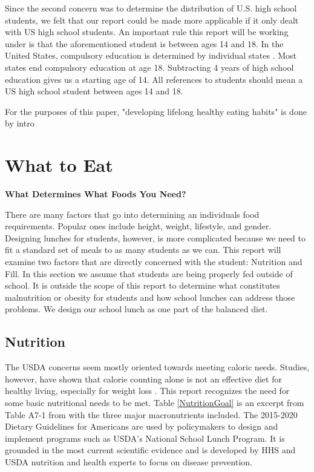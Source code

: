 \documentclass[letterpaper,oneside,12pt]{report}
\begin{document}
Since the second concern was to determine the distribution of U.S. high school students, we felt that our report could be made more applicable if it only dealt with US high school students. An important rule this report will be working under is that the aforementioned student is between ages 14 and 18. In the United States, compulsory education is determined by individual states \cite{aragon_2015}. Most states end compulsory education at age 18. Subtracting 4 years of high school education gives us a starting age of 14. All references to students should mean a US high school student between ages 14 and 18.

For the purposes of this paper, "developing lifelong healthy eating habits" is done by intro

\chapter{What to Eat}\label{What to Eat}

\textbf{What Determines What Foods You Need?}

There are many factors that go into determining an individuals food requirements. Popular ones include height, weight, lifestyle, and gender. Designing lunches for students, however, is more complicated because we need to fit a standard set of meals to as many students as we can. This report will examine two factors that are directly concerned with the student: Nutrition and Fill. In this section we assume that students are being properly fed outside of school. It is outside the scope of this report to determine what constitutes malnutrition or obesity for students and how school lunches can address those problems. We design our school lunch as one part of the balanced diet. 

\section{Nutrition}\label{Nutrition}
The USDA concerns seem mostly oriented towards meeting caloric needs. Studies, however, have shown that calorie counting alone is not an effective diet for healthy living, especially for weight loss \cite{heymsfield}. This report recognizes the need for some basic nutritional needs to be met. Table \ref{NutritionGoal} is an excerpt from Table A7-1 from \cite{us20152015} with the three major macronutrients included. The 2015-2020 Dietary Guidelines for Americans are used by policymakers to design and implement programs such as USDA's National School Lunch Program. It is grounded in the most current scientific evidence and is developed by HHS and USDA nutrition and health experts to focus on disease prevention.  
\end{document}
